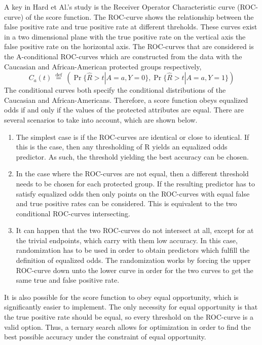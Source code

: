 \documentclass[11pt, fleqn, titlepage]{article}
\begin{document}
	A key in Hard et Al.'s study is the Receiver Operator Characteristic curve (ROC-curve) of the score function. The ROC-curve shows the relationship between the false positive rate and true positive rate at different threholds. These curves exist in a two dimensional plane with the true positive rate on the vertical axis the false positive rate on the horizontal axis. The ROC-curves that are considered is the A-conditional ROC-curves which are constructed from the data with the Caucasian and African-American protected groups respectively, 
	\begin{equation*}\label{key}
	C_{a}(t) \stackrel{\text { def }}{=}(\operatorname{Pr}\{\widehat{R}>t | A=a, Y=0\}, \operatorname{Pr}\{\widehat{R}>t | A=a, Y=1\})
	\end{equation*}
	The conditional curves both specify the conditional distributions of the Caucasian and African-Americans. Therefore, a score function obeys equalized odds if and only if the values of the protected attributes are equal. There are several scenarios to take into account, which are shown below. \cite{equal_of_oppor}
	\begin{enumerate}
		\item The simplest case is if the ROC-curves are identical or close to identical. If this is the case, then any thresholding of R yields an equalized odds predictor. As such, the threshold yielding the best accuracy can be chosen.
		\item In the case where the ROC-curves are not equal, then a different threshold needs to be chosen for each protected group. If the resulting predictor has to satisfy equalized odds then only points on the ROC-curves with equal false and true positive rates can be considered. This is equivalent to the two conditional ROC-curves intersecting. 
		\item It can happen that the two ROC-curves do not intersect at all, except for at the trivial endpoints, which carry with them low accuracy. In this case, randomization has to be used in order to obtain predictors which fulfill the definition of equalized odds. The randomization works by forcing the upper ROC-curve down unto the lower curve in order for the two curves to get the same true and false positive rate.
	\end{enumerate}
	It is also possible for the score function to obey equal opportunity, which is significantly easier to implement. The only necessity for equal opportunity is that the true positive rate should be equal, so every threshold on the ROC-curve is a valid option. Thus, a ternary search allows for optimization in order to find the best possible accuracy under the constraint of equal opportunity.
	
\end{document}
